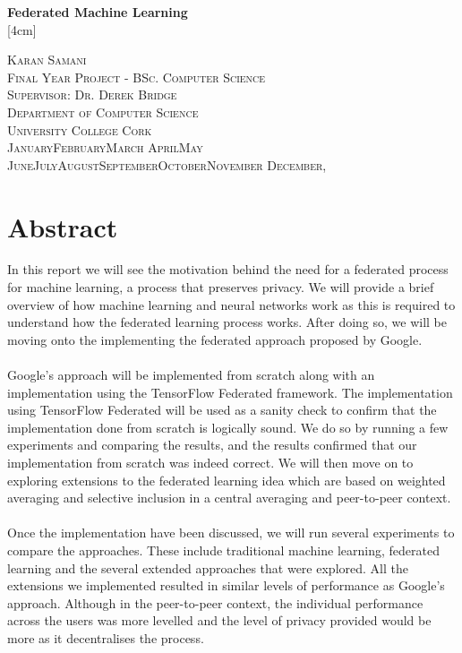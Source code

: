 \documentclass[12pt]{article}
\newcommand{\dateasreq}{\ifcase \month \or January\or February\or March\or %
April\or May \or June\or July\or August\or September\or October\or November\or %
December\fi, \number \year}
\begin{document}
\makeatletter

\begin{titlepage}
	\begin{center}
		\vspace*{1cm}			
		\huge{\bfseries Federated Machine Learning}\\
		[4cm]
	\end{center}
	\begin{center}	
		\textsc{\large Karan Samani}\\
		[2cm]
		\textsc{\large Final Year Project - BSc. Computer Science}\\
		[2cm]
		\textsc{\large Supervisor: Dr. Derek Bridge}\\
		[1cm]
		\textsc{\large Department of Computer Science}\\
		\textsc{\large University College Cork}\\
		[2cm]
		\textsc{\large \dateasreq}
	\end{center}
\end{titlepage}
\cleardoublepage

\section*{Abstract}
In this report we will see the motivation behind the need for a federated process for machine learning, a process that preserves privacy. We will provide a brief overview of how machine learning and neural networks work as this is required to understand how the federated learning process works. After doing so, we will be moving onto the implementing the federated approach proposed by Google.
\\\\
Google's approach will be implemented from scratch along with an implementation using the TensorFlow Federated framework. The implementation using TensorFlow Federated will be used as a sanity check to confirm that the implementation done from scratch is logically sound. We do so by running a few experiments and comparing the results, and the results confirmed that our implementation from scratch was indeed correct. We will then move on to exploring extensions to the federated learning idea which are based on weighted averaging and selective inclusion in a central averaging and peer-to-peer context. 
\\\\ 
Once the implementation have been discussed, we will run several experiments to compare the approaches. These include traditional machine learning, federated learning and the several extended approaches that were explored. All the extensions we implemented resulted in similar levels of performance as Google's approach. Although in the peer-to-peer context, the individual performance across the users was more levelled and the level of privacy provided would be more as it decentralises the process. 
\clearpage
\end{document}
